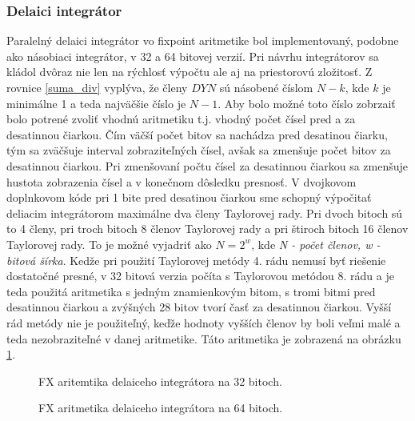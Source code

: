 \subsubsection*{Delaici integrátor}

Paralelný delaici integrátor vo fixpoint aritmetike bol implementovaný, podobne ako násobiaci integrátor, v 32 a 64 bitovej verzií. Pri návrhu integrátorov sa kládol dvôraz nie len na rýchlosť výpočtu ale aj na priestorovú zložitosť. 
Z rovnice \ref{suma_div} vyplýva, že členy $ DYN $ sú násobené číslom $ N-k $, kde $ k $ je minimálne 1 a teda najväčšie číslo je $ N-1 $. Aby bolo možné toto číslo zobrzaiť bolo potrené zvoliť vhodnú aritmetiku t.j. vhodný počet čísel pred a za desatinnou čiarkou. Čím väčší počet bitov sa nachádza pred desatinou čiarku, tým sa zväčšuje interval zobraziteľných čísel, avšak sa zmenšuje počet bitov za desatinnou čiarkou. Pri zmenšovaní počtu čísel za desatinnou čiarkou sa zmenšuje hustota zobrazenia čísel a v konečnom dôsledku presnosť. V dvojkovom doplnkovom kóde pri 1 bite pred desatinou čiarkou sme schopný výpočitať deliacim integrátorom maximálne dva členy Taylorovej rady. Pri dvoch bitoch sú to 4 členy, pri troch bitoch 8 členov Taylorovej rady a pri štiroch bitoch 16 členov Taylorovej rady. To je možné vyjadriť ako $ N = 2^{w} $, kde \textit{N - počet členov, w - bitová šírka}. Kedže pri použití Taylorovej metódy 4. rádu nemusí byť riešenie dostatočné presné, v 32 bitová verzia počíta s Taylorovou metódou 8. rádu a je teda použitá aritmetika s jedným znamienkovým bitom, s tromi bitmi pred desatinnou čiarkou a zvýšných 28 bitov tvorí časť za desatinnou čiarkou. Vyšší rád metódy nie je použiteľný, keďže hodnoty vyšších členov by boli veľmi malé a teda nezobraziteľné v danej aritmetike. Táto aritmetika je zobrazená na obrázku \ref{fxdivaritmetic32}.

\bigskip
\begin{figure}[h]
\centering
{}
\caption{FX aritemtika delaiceho integrátora na 32 bitoch.}
\label{fxdivaritmetic32}
\end{figure}
\bigskip


\bigskip
\begin{figure}[h]
\centering
{}
\caption{FX aritmetika delaiceho integrátora na 64 bitoch.}
\label{fxdivaritmetic64}
\end{figure}
\bigskip

